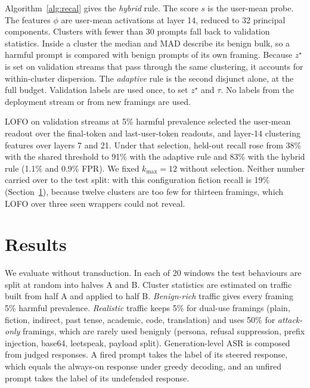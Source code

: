 \documentclass[11pt]{article}
\begin{document}
Algorithm~\ref{alg:recal} gives the \emph{hybrid} rule. The score $s$ is the user-mean probe. The features $\phi$ are user-mean activations at layer 14, reduced to 32 principal components. Clusters with fewer than 30 prompts fall back to validation statistics. Inside a cluster the median and MAD describe its benign bulk, so a harmful prompt is compared with benign prompts of its own framing. Because $z^\star$ is set on validation streams that pass through the same clustering, it accounts for within-cluster dispersion. The \emph{adaptive} rule is the second disjunct alone, at the full budget. Validation labels are used once, to set $z^\star$ and $\tau$. No labels from the deployment stream or from new framings are used.

LOFO on validation streams at 5\% harmful prevalence selected the user-mean readout over the final-token and last-user-token readouts, and layer-14 clustering features over layers 7 and 21. Under that selection, held-out recall rose from 38\% with the shared threshold to 91\% with the adaptive rule and 83\% with the hybrid rule (1.1\% and 0.9\% FPR). We fixed $k_{\max}=12$ without selection. Neither number carried over to the test split: with this configuration fiction recall is 19\% (Section~\ref{sec:results}), because twelve clusters are too few for thirteen framings, which LOFO over three seen wrappers could not reveal.

\section{Results}
\label{sec:results}

We evaluate without transduction. In each of 20 windows the test behaviours are split at random into halves A and B. Cluster statistics are estimated on traffic built from half A and applied to half B. \emph{Benign-rich} traffic gives every framing 5\% harmful prevalence. \emph{Realistic} traffic keeps 5\% for dual-use framings (plain, fiction, indirect, past tense, academic, code, translation) and uses 50\% for \emph{attack-only} framings, which are rarely used benignly (persona, refusal suppression, prefix injection, base64, leetspeak, payload split). Generation-level ASR is composed from judged responses. A fired prompt takes the label of its steered response, which equals the always-on response under greedy decoding, and an unfired prompt takes the label of its undefended response.
\end{document}
